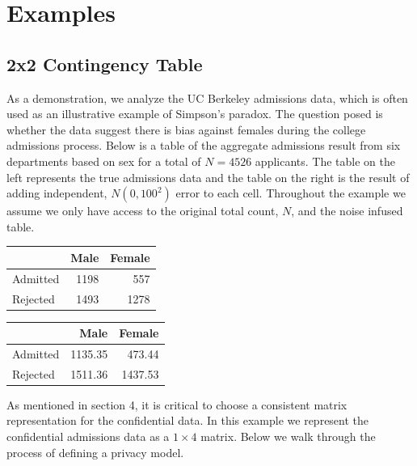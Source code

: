 \hypertarget{examples}{%
\section{Examples}\label{examples}}

\hypertarget{x2-contingency-table}{%
\subsection{2x2 Contingency Table}\label{x2-contingency-table}}

As a demonstration, we analyze the UC Berkeley admissions data, which is often
used as an illustrative example of Simpson's paradox. The question posed is whether
the data suggest there is bias against females during the college admissions
process. Below is a table of the aggregate admissions result from six departments based on sex
for a total of \(N = 4526\) applicants. The table on the left represents
the true admissions data and the table on the right is the result of adding
independent, \(N(0,100^2)\) error to each cell. Throughout the example
we assume we only have access to the original total count, \(N\), and
the noise infused table.

\begin{table}[!h]

\centering
\begin{tabular}[t]{lrr}
\toprule
  & Male & Female\\
\midrule
Admitted & 1198 & 557\\
Rejected & 1493 & 1278\\
\bottomrule
\end{tabular}
\centering
\begin{tabular}[t]{lrr}
\toprule
  & Male & Female\\
\midrule
Admitted & 1135.35 & 473.44\\
Rejected & 1511.36 & 1437.53\\
\bottomrule
\end{tabular}
\end{table}

As mentioned in section 4, it is critical to choose a consistent
matrix representation for the confidential data. In this example
we represent the confidential admissions data as a \(1 \times 4\) matrix.
Below we walk through the process of defining a privacy model.

